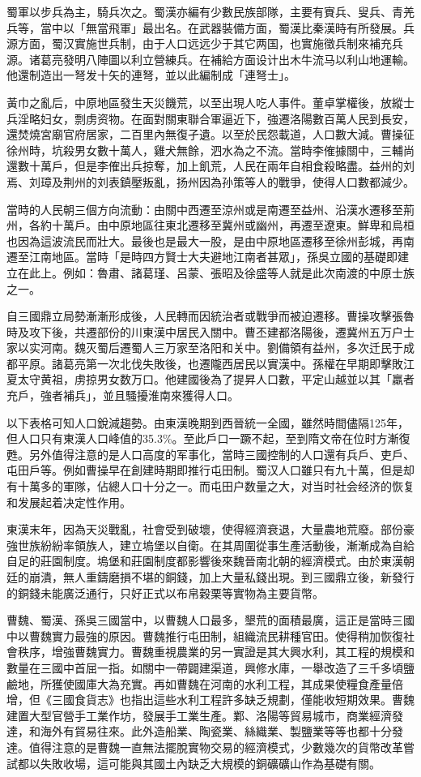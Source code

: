 蜀軍以步兵為主，騎兵次之。蜀漢亦編有少數民族部隊，主要有賨兵、叟兵、青羌兵等，當中以「無當飛軍」最出名。在武器裝備方面，蜀漢比秦漢時有所發展。兵源方面，蜀汉實施世兵制，由于人口远远少于其它两国，也實施徵兵制來補充兵源。诸葛亮發明八陣圖以利立營練兵。在補給方面设计出木牛流马以利山地運輸。他還制造出一弩发十矢的連弩，並以此編制成「連弩士」。

黃巾之亂后，中原地區發生天災饑荒，以至出現人吃人事件。董卓掌權後，放縱士兵淫略妇女，剽虏资物。在面對關東聯合軍逼近下，強遷洛陽數百萬人民到長安，還焚燒宮廟官府居家，二百里內無復孑遺。以至於民怨載道，人口數大減。曹操征徐州時，坑殺男女數十萬人，雞犬無餘，泗水為之不流。當時李傕據關中，三輔尚還數十萬戶，但是李傕出兵掠奪，加上飢荒，人民在兩年自相食殺略盡。益州的刘焉、刘璋及荆州的刘表鎮壓叛亂，扬州因為孙策等人的戰爭，使得人口數都減少。

當時的人民朝三個方向流動：由關中西遷至涼州或是南遷至益州、沿漢水遷移至荊州，各約十萬戶。由中原地區往東北遷移至冀州或幽州，再遷至遼東。鮮卑和烏桓也因為這波流民而壯大。最後也是最大一股，是由中原地區遷移至徐州彭城，再南遷至江南地區。當時「是時四方賢士大夫避地江南者甚眾」，孫吳立國的基礎即建立在此上。例如：魯肅、諸葛瑾、呂蒙、張昭及徐盛等人就是此次南渡的中原士族之一。

自三國鼎立局勢漸漸形成後，人民轉而因統治者或戰爭而被迫遷移。曹操攻擊張魯時及攻下後，共遷部份的川東漢中居民入關中。曹丕建都洛陽後，遷冀州五万户士家以实河南。魏灭蜀后遷蜀人三万家至洛阳和关中。劉備領有益州，多次迁民于成都平原。諸葛亮第一次北伐失敗後，也遷隴西居民以實漢中。孫權在早期即擊敗江夏太守黄祖，虏掠男女数万口。他建國後為了提昇人口數，平定山越並以其「羸者充戶，強者補兵」，並且騷擾淮南來獲得人口。

以下表格可知人口銳減趨勢。由東漢晚期到西晉統一全國，雖然時間儘隔125年，但人口只有東漢人口峰值的35.3\%。至此戶口一蹶不起，至到隋文帝在位时方漸復甦。另外值得注意的是人口高度的军事化，當時三國控制的人口還有兵戶、吏戶、屯田戶等。例如曹操早在創建時期即推行屯田制。蜀汉人口雖只有九十萬，但是却有十萬多的軍隊，佔總人口十分之一。而屯田户数量之大，对当时社会经济的恢复和发展起着决定性作用。

東漢末年，因為天災戰亂，社會受到破壞，使得經濟衰退，大量農地荒廢。部份豪強世族紛紛率領族人，建立塢堡以自衛。在其周圍從事生產活動後，漸漸成為自給自足的莊園制度。塢堡和莊園制度都影響後來魏晉南北朝的經濟模式。由於東漢朝廷的崩潰，無人重鑄磨損不堪的銅錢，加上大量私錢出現。到三國鼎立後，新發行的銅錢未能廣泛通行，只好正式以布帛穀栗等實物為主要貨幣。

曹魏、蜀漢、孫吳三國當中，以曹魏人口最多，墾荒的面積最廣，這正是當時三國中以曹魏實力最強的原因。曹魏推行屯田制，組織流民耕種官田。使得稍加恢復社會秩序，增強曹魏實力。曹魏重視農業的另一實證是其大興水利，其工程的規模和數量在三國中首屈一指。如關中一帶闢建渠道，興修水庫，一舉改造了三千多頃鹽鹼地，所獲使國庫大為充實。再如曹魏在河南的水利工程，其成果使糧食產量倍增，但《三國食貨志》也指出這些水利工程許多缺乏規劃，僅能收短期效果。曹魏建置大型官營手工業作坊，發展手工業生產。鄴、洛陽等貿易城市，商業經濟發達，和海外有貿易往來。此外造船業、陶瓷業、絲織業、製鹽業等等也都十分發達。值得注意的是曹魏一直無法擺脫實物交易的經濟模式，少數幾次的貨幣改革嘗試都以失敗收場，這可能與其國土內缺乏大規模的銅礦礦山作為基礎有關。

